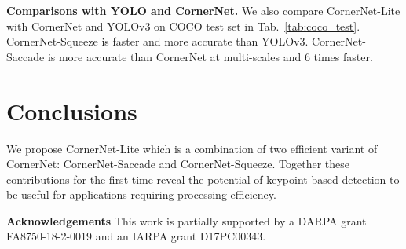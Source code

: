\documentclass{bmvc2k}
\begin{document}
\smallskip \noindent \textbf{Comparisons with YOLO and CornerNet.} We also compare CornerNet-Lite with CornerNet and YOLOv3 on COCO test set in Tab.~\ref{tab:coco_test}. CornerNet-Squeeze is faster and more accurate than YOLOv3. CornerNet-Saccade is more accurate than CornerNet at multi-scales and 6 times faster.

\section{Conclusions}
We propose CornerNet-Lite which is a combination of two efficient variant of CornerNet: CornerNet-Saccade and CornerNet-Squeeze. Together these contributions for the first time reveal the potential of keypoint-based detection to be useful for applications requiring processing efficiency.

\smallskip \noindent \textbf{Acknowledgements} This work is partially supported by a DARPA grant FA8750-18-2-0019 and an IARPA grant D17PC00343.


\end{document}
